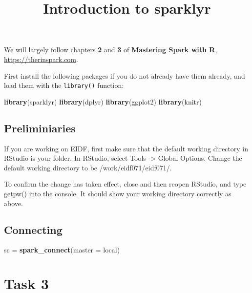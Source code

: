 \documentclass[
]{article}
\title{Introduction to sparklyr}
\author{}
\date{\vspace{-2.5em}}
\newenvironment{Shaded}{\begin{snugshade}}{\end{snugshade}}
\newcommand{\AttributeTok}[1]{\textcolor[rgb]{0.13,0.29,0.53}{#1}}
\newcommand{\FunctionTok}[1]{\textcolor[rgb]{0.13,0.29,0.53}{\textbf{#1}}}
\newcommand{\NormalTok}[1]{#1}
\newcommand{\OtherTok}[1]{\textcolor[rgb]{0.56,0.35,0.01}{#1}}
\newcommand{\StringTok}[1]{\textcolor[rgb]{0.31,0.60,0.02}{#1}}
\begin{document}
\maketitle

We will largely follow chapters \textbf{2} and \textbf{3} of
\textbf{Mastering Spark with R},
\href{https://therinspark.com/index.html}{https://therinspark.com}.

First install the following packages if you do not already have them
already, and load them with the \texttt{library()} function:

\begin{Shaded}
\begin{Highlighting}[]
\FunctionTok{library}\NormalTok{(sparklyr)}
\FunctionTok{library}\NormalTok{(dplyr)}
\FunctionTok{library}\NormalTok{(ggplot2)}
\FunctionTok{library}\NormalTok{(knitr)}
\end{Highlighting}
\end{Shaded}

\subsection{Preliminiaries}\label{preliminiaries}

If you are working on EIDF, first make sure that the default working
directory in RStudio is your folder. In RStudio, select Tools
-\textgreater{} Global Options. Change the default working directory to
be /work/eidf071/eidf071/.

To confirm the change has taken effect, close and then reopen RStudio,
and type getpw() into the console. It should show your working directory
correctly as above.

\subsection{Connecting}\label{connecting}

\begin{Shaded}
\begin{Highlighting}[]
\NormalTok{sc }\OtherTok{=} \FunctionTok{spark\_connect}\NormalTok{(}\AttributeTok{master =} \StringTok{\textquotesingle{}local\textquotesingle{}}\NormalTok{)}
\end{Highlighting}
\end{Shaded}

\section{Task 3}\label{task-3}
\end{document}
